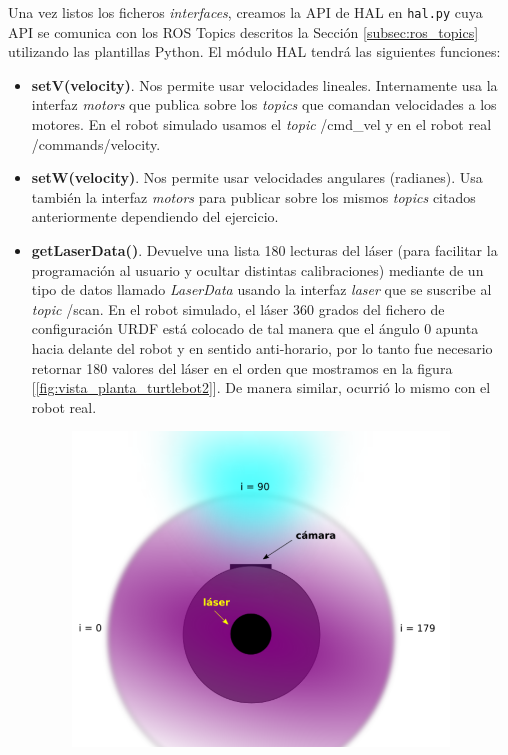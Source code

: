 Una vez listos los ficheros \textit{interfaces}, creamos la API de HAL en \texttt{hal.py} cuya API se comunica con los ROS Topics descritos la Sección \ref{subsec:ros_topics} utilizando las plantillas Python. El módulo HAL tendrá las siguientes funciones:\\

\begin{itemize}
	\item \textbf{setV(velocity)}. Nos permite usar velocidades lineales. Internamente usa la interfaz \textit{motors} que publica sobre los \textit{topics} que comandan velocidades a los motores. En el robot simulado usamos el \textit{topic} /cmd\_vel y en el robot real /commands/velocity.
	\item \textbf{setW(velocity)}. Nos permite usar velocidades angulares (radianes). Usa también la interfaz \textit{motors} para publicar sobre los mismos \textit{topics} citados anteriormente dependiendo del ejercicio.
	\item \textbf{getLaserData()}. Devuelve una lista 180 lecturas del láser (para facilitar la programación al usuario y ocultar distintas calibraciones) mediante de un tipo de datos llamado \textit{LaserData} usando la interfaz \textit{laser} que se suscribe al \textit{topic} /scan. En el robot simulado, el láser 360 grados del fichero de configuración URDF está colocado de tal manera que el ángulo 0 apunta hacia delante del robot y en sentido anti-horario, por lo tanto fue necesario retornar 180 valores del láser en el orden que mostramos en la figura [\ref{fig:vista_planta_turtlebot2}]. De manera similar, ocurrió lo mismo con el robot real.
\begin{figure} [H]
  \begin{center}
    \includegraphics[width=10cm]{imagenes/cap5/vista-planta-turtlebot2.png}

\end{center}
\end{figure}
\end{itemize}
